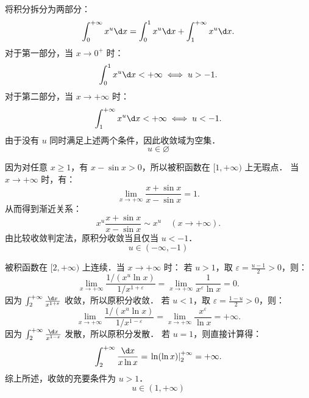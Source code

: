 \begin{solution}

    将积分拆分为两部分：
    \begin{equation}
        \int_0^{+\infty} x^u \d x = \int_0^1 x^u \d x + \int_1^{+\infty} x^u \d x.
    \end{equation}
    对于第一部分，当 $x \to 0^+$ 时：
    \begin{equation}
        \int_0^1 x^u \d x < +\infty \iff u > -1.
    \end{equation}
    对于第二部分，当 $x \to +\infty$ 时：
    \begin{equation}
        \int_1^{+\infty} x^u \d x < +\infty \iff u < -1.
    \end{equation}
    由于没有 $u$ 同时满足上述两个条件，因此收敛域为空集．
    \begin{equation}
        \boxed{u \in \varnothing}
    \end{equation}


    因为对任意 $x \geqslant 1$，有 $x - \sin x > 0$，所以被积函数在 $[1, +\infty)$ 上无瑕点．
    当 $x \to +\infty$ 时，有：
    \begin{equation}
        \lim_{x \to +\infty} \frac{x + \sin x}{x - \sin x} = 1.
    \end{equation}
    从而得到渐近关系：
    \begin{equation}
        x^u \frac{x + \sin x}{x - \sin x} \sim x^u \quad (x \to +\infty).
    \end{equation}
    由比较收敛判定法，原积分收敛当且仅当 $u < -1$．
    \begin{equation}
        \boxed{u \in (-\infty, -1)}
    \end{equation}


    被积函数在 $[2, +\infty)$ 上连续．当 $x \to +\infty$ 时：
    若 $u > 1$，取 $\varepsilon = \frac{u-1}{2} > 0$，则：
    \begin{equation}
        \lim_{x \to +\infty} \frac{1 / (x^u \ln x)}{1 / x^{1+\varepsilon}} = \lim_{x \to +\infty} \frac{1}{x^\varepsilon \ln x} = 0.
    \end{equation}
    因为 $\int_2^{+\infty} \frac{\d x}{x^{1+\varepsilon}}$ 收敛，所以原积分收敛．
    若 $u < 1$，取 $\varepsilon = \frac{1-u}{2} > 0$，则：
    \begin{equation}
        \lim_{x \to +\infty} \frac{1 / (x^u \ln x)}{1 / x^{1-\varepsilon}} = \lim_{x \to +\infty} \frac{x^\varepsilon}{\ln x} = +\infty.
    \end{equation}
    因为 $\int_2^{+\infty} \frac{\d x}{x^{1-\varepsilon}}$ 发散，所以原积分发散．
    若 $u = 1$，则直接计算得：
    \begin{equation}
        \int_2^{+\infty} \frac{\d x}{x \ln x} = \left. \ln(\ln x) \right|_2^{+\infty} = +\infty.
    \end{equation}
    综上所述，收敛的充要条件为 $u > 1$．
    \begin{equation}
        \boxed{u \in (1, +\infty)}
    \end{equation}


\end{solution}
